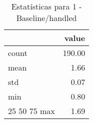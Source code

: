 \begin{table}[htbp]
\caption{Estatísticas para 1 - Baseline/handled}
\label{tab:1_-_baseline_handled_summary}
\begin{tabular}{lr}
\toprule
 & value \\
\midrule
count & 190.00 \\
mean & 1.66 \\
std & 0.07 \\
min & 0.80 \\
25%
50%
75%
max & 1.69 \\
\bottomrule
\end{tabular}
\end{table}
